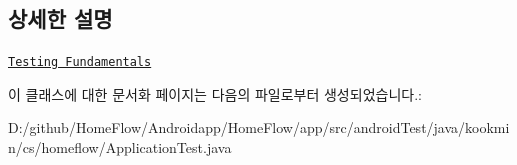 \subsection{상세한 설명}
\href{http://d.android.com/tools/testing/testing_android.html}{\tt Testing Fundamentals} 

이 클래스에 대한 문서화 페이지는 다음의 파일로부터 생성되었습니다.\+:\begin{DoxyCompactItemize}
\item 
D\+:/github/\+Home\+Flow/\+Androidapp/\+Home\+Flow/app/src/android\+Test/java/kookmin/cs/homeflow/Application\+Test.\+java\end{DoxyCompactItemize}
